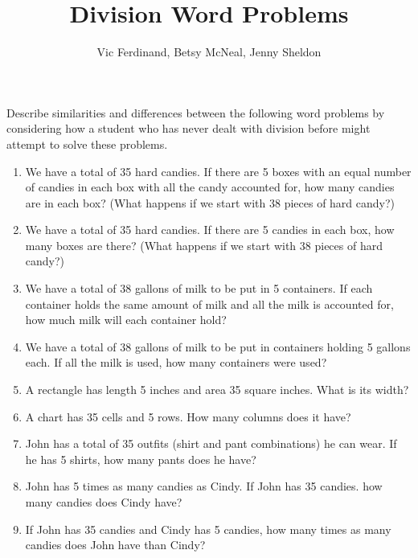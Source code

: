 \documentclass{ximera}
\title{Division Word Problems}
\author{Vic Ferdinand, Betsy McNeal, Jenny Sheldon}
\begin{document}
\begin{abstract} \end{abstract}
\maketitle



\begin{problem}
Describe similarities and differences between the following word problems by considering how a student who has never dealt with division before might attempt to solve these problems.

\begin{enumerate}
\item We have a total of 35 hard candies.  If there are 5 boxes with an equal number of candies in each box with all the candy accounted for, how many candies are in each box? (What happens if we start with 38 pieces of hard candy?)

\item We have a total of 35 hard candies.  If there are 5 candies in each box, how many boxes are there? (What happens if we start with 38 pieces of hard candy?)

\item We have a total of 38 gallons of milk to be put in 5 containers.  If each container holds the same amount of milk and all the milk is accounted for, how much milk will each container hold?

\item We have a total of 38 gallons of milk to be put in containers holding 5 gallons each.  If all the milk is used, how many containers were used?


\item  A rectangle has length 5 inches and area 35 square inches.  What is its width?


\item  A chart has 35 cells and 5 rows.  How many columns does it have?


\item John has a total of 35 outfits (shirt and pant combinations) he can wear.  If he has 5 shirts, how many pants does he have?

\item John has 5 times as many candies as Cindy.  If John has 35 candies. how many candies does Cindy have?
\item If John has 35 candies and Cindy has 5 candies, how many times as many candies does John have than Cindy?
\end{enumerate}

\end{problem}
\end{document}
